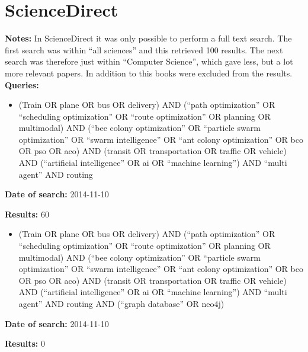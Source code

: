 \section{ScienceDirect}
\textbf{Notes:} In ScienceDirect it was only possible to perform a full text search. The first search was within ``all sciences'' and this retrieved 100 results. The next search was therefore just within ``Computer Science'', which gave less, but a lot more relevant papers. In addition to this books were excluded from the results.
\newline
\newline
\textbf{Queries:}
\begin{itemize}
\item (Train OR plane OR bus OR delivery) AND (``path optimization'' OR ``scheduling optimization'' OR ``route optimization'' OR planning OR multimodal) AND (``bee colony optimization'' OR ``particle swarm optimization'' OR ``swarm intelligence'' OR ``ant colony optimization'' OR bco OR pso OR aco) AND (transit OR transportation OR traffic OR vehicle) AND (``artificial intelligence'' OR ai OR ``machine learning'') AND ``multi agent'' AND routing
\end{itemize}
\par \textbf{Date of search:} 2014-11-10 
\par \textbf{Results:} 60
\begin{itemize}
\item (Train OR plane OR bus OR delivery) AND (``path optimization'' OR ``scheduling optimization'' OR ``route optimization'' OR planning OR multimodal) AND (``bee colony optimization'' OR ``particle swarm optimization'' OR ``swarm intelligence'' OR ``ant colony optimization'' OR bco OR pso OR aco) AND (transit OR transportation OR traffic OR vehicle) AND (``artificial intelligence'' OR ai OR ``machine learning'') AND ``multi agent'' AND routing AND (``graph database'' OR neo4j)
\end{itemize}
\par \textbf{Date of search:} 2014-11-10 
\par \textbf{Results:} 0


